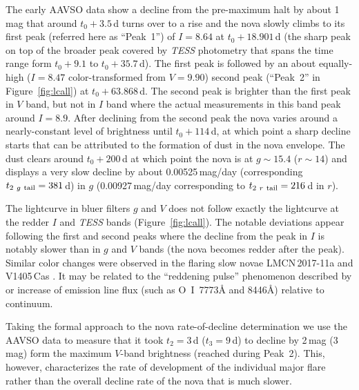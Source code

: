 \documentclass[twocolumn]{aastex631}
\begin{document}
The early AAVSO data show a decline from the pre-maximum halt by about 1\,mag 
that around $t_0 + 3.5$\,d turns over to a rise and the nova slowly climbs to its 
first peak (referred here as ``Peak~1'') of $I = 8.64$ at $t_0 + 18.901$\,d (the sharp peak on top of the broader peak
covered by {\em TESS} photometry that spans the time range form $t_0 + 9.1$ to $t_0 + 35.7$\,d). 
The first peak is followed by an about equally-high 
($I = 8.47$ color-transformed from $V=9.90$) second peak (``Peak~2'' in Figure~\ref{fig:lcall}) at $t_0 + 63.868$\,d. 
The second peak is brighter than the first peak in $V$ band, 
but not in $I$ band where the actual measurements in this band peak around $I=8.9$.
After declining from the second peak the nova varies around 
a nearly-constant level of brightness until $t_0 + 114$\,d, at which point 
a sharp decline starts that can be attributed to the formation of dust in 
the nova envelope. The dust clears around $t_0 + 200$\,d at which point the nova is
at $g \sim 15.4$ ($r \sim 14$) and displays a very slow decline by about 
0.00525\,mag/day (corresponding $t_{2~g~{\rm tail}} = 381$\,d) in $g$ (0.00927\,mag/day corresponding to $t_{2~r~{\rm tail}} = 216$\,d in $r$). 
%

The lightcurve in bluer filters $g$ and $V$ does not follow exactly the
lightcurve at the redder $I$ and {\em TESS} bands (Figure~\ref{fig:lcall}). The notable deviations
appear following the first and second peaks where the decline from the peak
in $I$ is notably slower than in $g$ and $V$ bands (the nova becomes redder after the peak).
Similar color changes were observed in the flaring slow novae LMCN\,2017-11a \cite{2019arXiv190309232A} and V1405\,Cas \citep{2023arXiv230204656V}.
It may be related to the ``reddening pulse'' phenomenon described by \cite{1987A&AS...70..125V} or increase of emission line flux (such as O~I~7773\AA{} and 8446\AA{}) relative to continuum.

Taking the formal approach to the nova rate-of-decline determination we 
use the AAVSO data to measure that it took $t_2 = 3$\,d ($t_3 = 9$\,d) to decline 
by 2\,mag (3\,mag) form the maximum $V$-band brightness (reached during Peak~2). 
This, however, characterizes the rate of development of the individual
major flare rather than the overall decline rate of the nova that is much slower.
\end{document}
